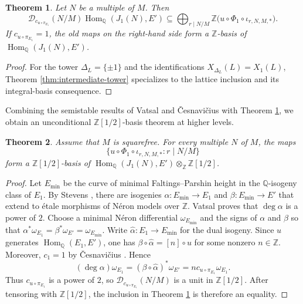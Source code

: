 \documentclass[12pt, letterpaper]{amsart}
\newtheorem{theorem}{Theorem}[section]
\theoremstyle{definition}
\theoremstyle{remark}
\newcommand{\Q}{\mathbb Q}
\newcommand{\Z}{\mathbb Z}
\newcommand{\Hom}{\operatorname{Hom}}
\numberwithin{equation}{section}
\begin{document}
\begin{theorem}\label{thm:x1-fixed-target}
Let \(N\) be a multiple of \(M\). Then
\[
        \mathcal D_{c_{u\circ\pi_{E_1}}}(N/M)\Hom_\Q(J_1(N),E')
        \subseteq
        \bigoplus_{r\mid N/M}\Z
        \bigl(u\circ\Phi_1\circ\iota_{r,N,M,*}\bigr).
\]
If \(c_{u\circ\pi_{E_1}}=1\), the old maps on the right-hand side form a
\(\Z\)-basis of
\(\Hom_\Q(J_1(N),E')\).
\end{theorem}

\begin{proof}
For the tower \(\Delta_L=\{\pm1\}\) and the identifications
\(X_{\Delta_L}(L)=X_1(L)\), Theorem \ref{thm:intermediate-tower} specializes to
the lattice inclusion and its integral-basis consequence.
\end{proof}

Combining the semistable results of Vatsal
\cite{VatsalMultiplicative} and \v{C}esnavi\v{c}ius
\cite{CesnaviciusManinSemistable} with Theorem
\ref{thm:x1-fixed-target}, we obtain an unconditional \(\Z[1/2]\)-basis
theorem at higher levels.

\begin{theorem}\label{cor:x1-vatsal-lattice}
Assume that \(M\) is squarefree. For every multiple \(N\) of \(M\), the maps
\[
        \bigl\{u\circ\Phi_1\circ\iota_{r,N,M,*}:r\mid N/M\bigr\}
\]
form a \(\Z[1/2]\)-basis of
\(\Hom_\Q(J_1(N),E')\otimes_\Z\Z[1/2]\).
\end{theorem}

\begin{proof}
Let \(E_{\min}\) be the curve of minimal Faltings--Parshin height in the
\(\Q\)-isogeny class of \(E_1\). By Stevens
\cite[Theorem~2.3]{StevensStickelberger}, there are isogenies
\(\alpha:E_{\min}\to E_1\) and \(\beta:E_{\min}\to E'\) that extend to
\'{e}tale morphisms of N\'eron models over \(\Z\). Vatsal
\cite[Theorem~1.10]{VatsalMultiplicative} proves that
\(\deg\alpha\) is a power of \(2\).
Choose a minimal N\'eron differential \(\omega_{E_{\min}}\) and the signs of
\(\alpha\) and \(\beta\) so that
\(\alpha^*\omega_{E_1}=\beta^*\omega_{E'}=\omega_{E_{\min}}\).
Write \(\widehat\alpha:E_1\to E_{\min}\) for the dual isogeny.
Since \(u\) generates \(\Hom_\Q(E_1,E')\), one has
\(\beta\circ\widehat\alpha=[n]\circ u\) for some nonzero \(n\in\Z\).
Moreover, \(c_1=1\) by \v{C}esnavi\v{c}ius
\cite{CesnaviciusManinSemistable}. Hence
\[
        (\deg\alpha)\omega_{E_1}
        =(\beta\circ\widehat\alpha)^*\omega_{E'}
        =n c_{u\circ\pi_{E_1}}\omega_{E_1}.
\]
Thus \(c_{u\circ\pi_{E_1}}\) is a power of \(2\), so
\(\mathcal D_{c_{u\circ\pi_{E_1}}}(N/M)\) is a unit in \(\Z[1/2]\).
After tensoring with \(\Z[1/2]\), the inclusion in Theorem
\ref{thm:x1-fixed-target} is therefore an equality.
\end{proof}
\end{document}
